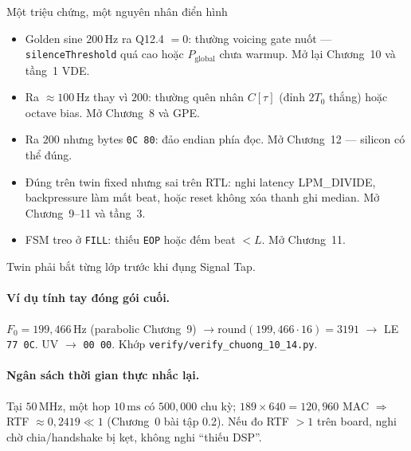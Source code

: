 \begin{firstprin}{Một triệu chứng, một nguyên nhân điển hình}
\begin{itemize}[leftmargin=1.4em]
    \item Golden sine $200\,\text{Hz}$ ra Q12.4 $=0$: thường voicing gate nuốt --- \texttt{silenceThreshold} quá cao hoặc $P_{\mathrm{global}}$ chưa warmup. Mở lại Chương~10 và tầng~1 VDE.
    \item Ra $\approx 100\,\text{Hz}$ thay vì $200$: thường quên nhân $C[\tau]$ (đỉnh $2T_0$ thắng) hoặc octave bias. Mở Chương~8 và GPE.
    \item Ra $200$ nhưng bytes \texttt{0C 80}: đảo endian phía đọc. Mở Chương~12 --- silicon có thể đúng.
    \item Đúng trên twin fixed nhưng sai trên RTL: nghi latency LPM\_DIVIDE, backpressure làm mất beat, hoặc reset không xóa thanh ghi median. Mở Chương~9--11 và tầng~3.
    \item FSM treo ở \texttt{FILL}: thiếu \texttt{EOP} hoặc đếm beat $<L$. Mở Chương~11.
\end{itemize}
Twin phải bắt từng lớp trước khi đụng Signal Tap.
\end{firstprin}

\paragraph{Ví dụ tính tay đóng gói cuối.} $F_0=199{,}466\,\text{Hz}$ (parabolic Chương~9) $\to\mathrm{round}(199{,}466\cdot 16)=3191$ $\to$ LE \texttt{77 0C}. UV $\to$ \texttt{00 00}. Khớp \texttt{verify/verify\_chuong\_10\_14.py}.

\paragraph{Ngân sách thời gian thực nhắc lại.} Tại $50\,\text{MHz}$, một hop $10\,\text{ms}$ có $500{,}000$ chu kỳ; $189\times 640=120{,}960$ MAC $\Rightarrow$ RTF $\approx 0{,}2419\ll 1$ (Chương~0 bài tập 0.2). Nếu đo RTF $>1$ trên board, nghi chờ chia/handshake bị kẹt, không nghi ``thiếu DSP''.

